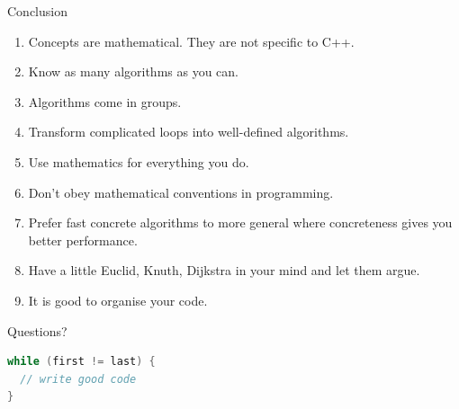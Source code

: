 \documentclass[10pt]{beamer}
\begin{document}
\begin{frame}{Conclusion}
  \begin{enumerate}
    \item Concepts are mathematical. They are not specific to C++.
    \item Know as many algorithms as you can.
    \item Algorithms come in groups.
    \item Transform complicated loops into well-defined algorithms.
    \item Use mathematics for everything you do.
    \item Don't obey mathematical conventions in programming.
    \item Prefer fast concrete algorithms to more general where concreteness gives you better performance.
    \item Have a little Euclid, Knuth, Dijkstra in your mind and let them argue.
    \item It is good to organise your code.
  \end{enumerate}
\end{frame}

\begin{frame}[fragile]{Questions?}
\begin{lstlisting}[language=C++,basicstyle=\huge]
while (first != last) {
  // write good code
}
\end{lstlisting}
\end{frame}
\end{document}
